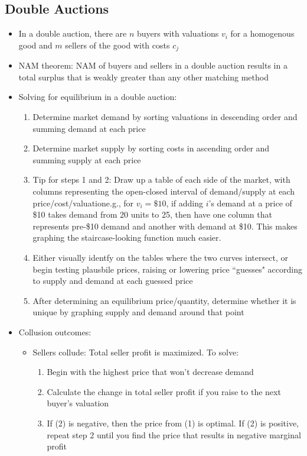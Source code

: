 \documentclass{article}
\begin{document}

\subsection{Double Auctions}

\begin{itemize}
	\item In a double auction, there are $n$ buyers with valuations $v_i$ for a homogenous good and $m$ sellers of the good with costs $c_j$
	
	\item NAM theorem: NAM of buyers and sellers in a double auction results in a total surplus that is weakly greater than any other matching method
	
	\item Solving for equilibrium in a double auction:
		\begin{enumerate}
			\item Determine market demand by sorting valuations in descending order and summing demand at each price
			\item Determine market supply by sorting costs in ascending order and summing supply at each price 
			\item Tip for steps 1 and 2: Draw up a table of each side of the market, with columns representing the open-closed interval of demand/supply at each price/cost/valuation\textemdash e.g., for ${v_i=\$10}$, if adding $i$'s demand at a price of \$10 takes demand from 20 units to 25, then have one column that represents pre-\$10 demand and another with demand at \$10. This makes graphing the staircase-looking function much easier.
			\item Either visually identfy on the tables where the two curves intersect, or begin testing plausbile prices, raising or lowering price ``guesses" according to supply and demand at each guessed price 
			\item After determining an equilibrium price/quantity, determine whether it is unique by graphing supply and demand around that point
		\end{enumerate}
	
	\item Collusion outcomes:
		\begin{itemize}
			\item Sellers collude: Total seller profit is maximized. To solve:
				\begin{enumerate}
					\item Begin with the highest price that won't decrease demand 
					\item Calculate the change in total seller profit if you raise to the next buyer's valuation
					\item If (2) is negative, then the price from (1) is optimal. If (2) is positive, repeat step 2 until you find the price that results in negative marginal profit
				\end{enumerate}
			

\end{itemize}
\end{itemize}
\end{document}
